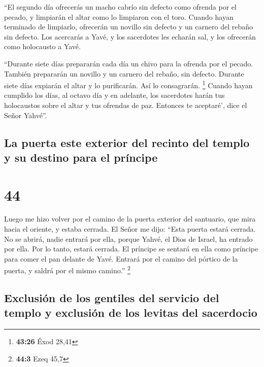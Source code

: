  ``El segundo día ofrecerás un macho cabrío sin defecto
como ofrenda por el pecado, y limpiarán el altar como lo limpiaron con
el toro.  Cuando hayan terminado de limpiarlo, ofrecerán
un novillo sin defecto y un carnero del rebaño sin defecto.
 Los acercarás a Yavé, y los sacerdotes les echarán sal,
y los ofrecerán como holocausto a Yavé.

 ``Durante siete días prepararán cada día un chivo para
la ofrenda por el pecado. También prepararán un novillo y un carnero del
rebaño, sin defecto.  Durante siete días expiarán el
altar y lo purificarán. Así lo consagrarán. \footnote{\textbf{43:26}
  Éxod 28,41}  Cuando hayan cumplido los días, al octavo
día y en adelante, los sacerdotes harán tus holocaustos sobre el altar y
tus ofrendas de paz. Entonces te aceptaré', dice el Señor Yahvé''.

\hypertarget{la-puerta-este-exterior-del-recinto-del-templo-y-su-destino-para-el-pruxedncipe}{%
\subsection{La puerta este exterior del recinto del templo y su destino
para el
príncipe}\label{la-puerta-este-exterior-del-recinto-del-templo-y-su-destino-para-el-pruxedncipe}}

\hypertarget{section-43}{%
\section{44}\label{section-43}}

 Luego me hizo volver por el camino de la puerta exterior
del santuario, que mira hacia el oriente, y estaba cerrada.
 El Señor me dijo: ``Esta puerta estará cerrada. No se
abrirá, nadie entrará por ella, porque Yahvé, el Dios de Israel, ha
entrado por ella. Por lo tanto, estará cerrada.  El
príncipe se sentará en ella como príncipe para comer el pan delante de
Yavé. Entrará por el camino del pórtico de la puerta, y saldrá por el
mismo camino.'' \footnote{\textbf{44:3} Ezeq 45,7}

\hypertarget{exclusiuxf3n-de-los-gentiles-del-servicio-del-templo-y-exclusiuxf3n-de-los-levitas-del-sacerdocio}{%
\subsection{Exclusión de los gentiles del servicio del templo y
exclusión de los levitas del
sacerdocio}\label{exclusiuxf3n-de-los-gentiles-del-servicio-del-templo-y-exclusiuxf3n-de-los-levitas-del-sacerdocio}}

